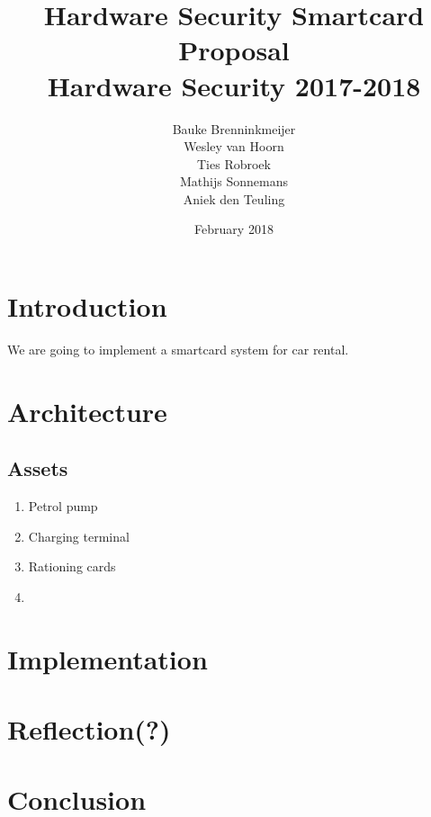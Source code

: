 \documentclass{article}
\title{Hardware Security Smartcard Proposal \\ Hardware Security 2017-2018}
\author{Bauke Brenninkmeijer \\Wesley van Hoorn \\Ties Robroek \\
Mathijs Sonnemans \\ Aniek den Teuling}
\date{February 2018}
\begin{document}
\maketitle

\section{Introduction}
We are going to implement a smartcard system for car rental.

\section{Architecture}
\subsection{Assets}
\begin{enumerate}
  \item Petrol pump
  \item Charging terminal
  \item Rationing cards
  \item
\end{enumerate}






\section{Implementation}




\section{Reflection(?)}



\section{Conclusion}
\end{document}
